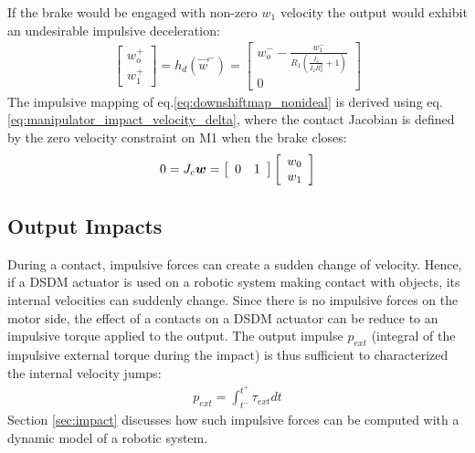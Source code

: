 %
If the brake would be engaged with non-zero $w_1$ velocity the output would exhibit an undesirable impulsive deceleration:
\begin{align} 
\left[
\begin{array}{c}
w_o^+ \\ w_1^+
\end{array}
\right]
 = h_d( \vec{w}^- ) = 
\left[
\begin{array}{c}
w_o^- - \frac{w_1^-}{ R_1 \left( \frac{I_o}{I_2 R_2^2} + 1 \right) } \\ 0
\end{array}
\right]
\label{eq:downshiftmap_nonideal}
\end{align}
%
The impulsive mapping of eq.\eqref{eq:downshiftmap_nonideal} is derived using eq.\eqref{eq:manipulator_impact_velocity_delta}, where the contact Jacobian is defined by the zero velocity constraint on M1 when the brake closes:
\begin{align} 
0 = J_c \vec{w} = 
\left[
\begin{array}{c c}
0 & 1
\end{array}
\right] 
\left[
\begin{array}{c}
w_0 \\ w_1 
\end{array}
\right]
\label{eq:downshiftmap_nonideal_jacobian}
\end{align}




\subsection{Output Impacts}
\label{sec:model_impact}

During a contact, impulsive forces can create a sudden change of velocity. Hence, if a DSDM actuator is used on a robotic system making contact with objects, its internal velocities can suddenly change. Since there is no impulsive forces on the motor side, the effect of a contacts on a DSDM actuator can be reduce to an impulsive torque applied to the output. The output impulse $p_{ext}$ (integral of the impulsive external torque during the impact) is thus sufficient to characterized the internal velocity jumps:
%
\begin{align}
p_{ext} = \int_{t^-}^{t^+} \tau_{ext} dt
\label{eq:outputimpulsedefine}
\end{align}
%
Section \ref{sec:impact} discusses how such impulsive forces can be computed with a dynamic model of a robotic system.

